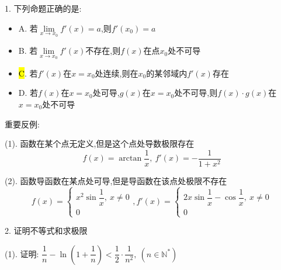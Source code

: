 1. 下列命题正确的是:  
\begin{itemize}
	\item A. 若$\lim\limits_{x\rightarrow x_{0}}f'(x)=a$,则$f'(x_{0})=a$
	\item B. 若$\lim\limits_{x\rightarrow x_{0}}f'(x)$不存在,则$f(x)$在点$x_{0}$处不可导
	\item \hl{C}. 若$f'(x)$在$x=x_{0}$处连续,则在$x_{0}$的某邻域内$f'(x)$存在
	\item D. 若$f(x)$在$x=x_{0}$处可导,$g(x)$在$x=x_{0}$处不可导,则$f(x)\cdot g(x)$在$x=x_{0}$处不可导
\end{itemize}
\begin{solution}

	重要反例:  
	
	(1). 函数在某个点无定义,但是这个点处导数极限存在
	$$f(x)=\arctan\dfrac{1}{x},\ f'(x)=-\dfrac{1}{1+x^2}$$
	
	(2). 函数导函数在某点处可导,但是导函数在该点处极限不存在
	$$f(x)=\left\lbrace
	\begin{array}{l}
		x^2\sin\dfrac{1}{x},\ x\neq 0\\
		0
	\end{array}
	\right. ,f'(x)=\left\lbrace
	\begin{array}{l}
		2x\sin\dfrac{1}{x}-\cos\dfrac{1}{x},\ x\neq 0\\
		0
	\end{array}
	\right. $$
\end{solution}

2. 证明不等式和求极限

(1). 证明:  $\dfrac{1}{n}-\ln(1+\dfrac{1}{n})<\dfrac{1}{2}\cdot\dfrac{1}{n^2},\ (n\in\mathbb{N}^{*})$


